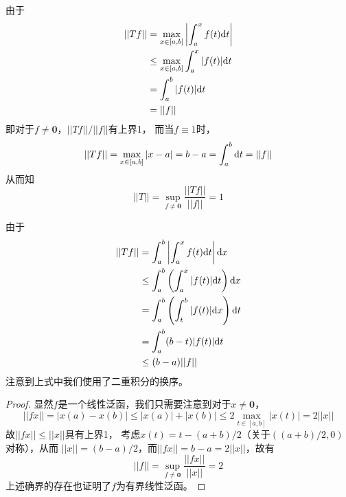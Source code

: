 \documentclass[cn]{homework}
\begin{document}
    \problem
    \begin{subproblem}[(\arabic*)]
        \item
        由于
        \[\begin{aligned}
            ||Tf||&=\max_{x\in[a,b]}\left|\int_a^xf(t)\mathrm d t\right|\\
            &\leq\max_{x\in[a,b]}\int_a^x|f(t)|\mathrm d t\\
            &=\int_a^b|f(t)|\mathrm d t\\
            &=||f||
        \end{aligned}\]
        即对于$f\neq\boldsymbol 0$，$||Tf||/||f||$有上界1，
        而当$f\equiv 1$时，
        \[||Tf||=\max_{x\in[a,b]}|x-a|=b-a=\int_a^b\mathrm d t=||f||\]
        从而知
        \[||T||=\sup_{f\neq\boldsymbol 0}\frac{||Tf||}{||f||}=1\]

        \item
        由于
        \[\begin{aligned}
            ||Tf||&=\int_a^b\left|\int_a^xf(t)\mathrm d t\right|\mathrm d x\\
            &\leq\int_a^b\left(\int_a^x|f(t)|\mathrm d t\right)\mathrm d x\\
            &=\int_a^b\left(\int_t^b|f(t)|\mathrm d x\right)\mathrm d t\\
            &=\int_a^b(b-t)|f(t)|\mathrm d t\\
            &\leq(b-a)||f||
        \end{aligned}\]
        注意到上式中我们使用了二重积分的换序。

    \end{subproblem}

    \problem
    \begin{proof}
        显然$f$是一个线性泛函，我们只需要注意到对于$x\neq\boldsymbol 0$，
        \[||fx||=|x(a)-x(b)|
        \leq|x(a)|+|x(b)|
        \leq 2\max_{t\in[a,b]}|x(t)|
        =2||x||\]
        故$||fx||\leq ||x||$具有上界1，
        考虑$x(t)=t-(a+b)/2$（关于$((a+b)/2,0)$对称），从而
        $||x||=(b-a)/2$，而$||fx||=b-a=2||x||$，故有
        \[||f||=\sup_{f\neq\boldsymbol 0}\frac{||fx||}{||x||}
        =2\]
        上述确界的存在也证明了$f$为有界线性泛函。
    \end{proof}

    
\end{document}
